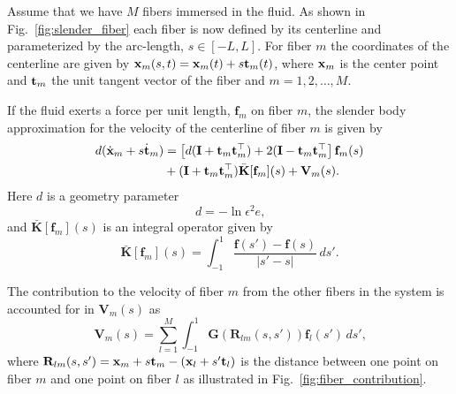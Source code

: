 Assume that we have $M$ fibers immersed in the fluid. As shown in Fig.~\ref{fig:slender_fiber} each fiber is now defined by its centerline and parameterized by the arc-length, $s \in [-L,L]$. For fiber $m$ the coordinates of the centerline are given by $\mathbf{x}_m(s,t) = \mathbf{x}_m(t) + s\mathbf{t}_m(t)$, where $\mathbf{x}_m$ is the center point and $\mathbf{t}_m$ the unit tangent vector of the fiber and $m=1,2,\dots,M$.

If the fluid exerts a force per unit length, $\mathbf{f}_m$ on fiber $m$, the slender body approximation for the velocity of the centerline of fiber $m$ is given by
\begin{equation}
  \label{eq:velocity_centerline}
  \begin{aligned}
    d(\dot{\mathbf{x}}_m + s \dot{\mathbf{t}}_m) &= \left[ d(\mathbf{I} + \mathbf{t}_m\mathbf{t}_m^\top) + 2(\mathbf{I} - \mathbf{t}_m\mathbf{t}_m^\top\right]\mathbf{f}_m(s) \\
    &+ (\mathbf{I} + \mathbf{t}_m\mathbf{t}_m^\top)\bar{\mathbf{K}}[\mathbf{f}_m](s) + \mathbf{V}_m(s) \text{.}
  \end{aligned}
\end{equation}
Here $d$ is a geometry parameter
\begin{equation}
  \label{eq:geometry_parameter}
  d = -\ln{\epsilon^2e} \text{,}
\end{equation}
and $\bar{\mathbf{K}}[\mathbf{f}_m](s)$ is an integral operator given by
\begin{equation}
  \label{eq:integral_operator}
  \bar{\mathbf{K}}[\mathbf{f}_m](s) = \int_{-1}^{1} \frac{\mathbf{f}(s') - \mathbf{f}(s)}{|s' - s|} \, ds' \text{.}
\end{equation}

The contribution to the velocity of fiber $m$ from the other fibers in the system is accounted for in $\mathbf{V}_m(s)$ as
\begin{equation}
  \label{eq:velocity_contribution}
  \mathbf{V}_m(s) = \sum_{l=1}^M \int_{-1}^{1} \mathbf{G}(\mathbf{R}_{lm}(s,s'))\mathbf{f}_l(s') \, ds' \text{,}
\end{equation}
where $\mathbf{R}_{lm}(s,s') = \mathbf{x}_m + s\mathbf{t}_m - (\mathbf{x}_l + s'\mathbf{t}_l)$ is the distance between one point on fiber $m$ and one point on fiber $l$ as illustrated in Fig.~\ref{fig:fiber_contribution}.

